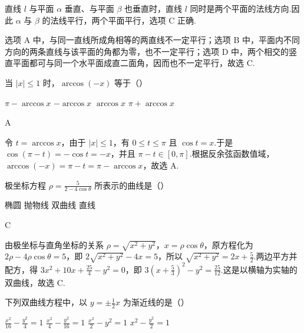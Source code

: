 \documentclass[UTF8,a4paper,oneside,11pt]{ctexbook}
\begin{document}
\begin{solution}
直线 \(l\) 与平面 \(\alpha\) 垂直、与平面 \(\beta\) 也垂直时，直线 \(l\) 同时是两个平面的法线方向.因此 \(\alpha\) 与 \(\beta\) 的法线平行，两个平面平行，选项 C 正确.

选项 A 中，与同一直线所成角相等的两直线不一定平行；选项 B 中，平面内不同方向的两条直线与该平面的角都为零，也不一定平行；选项 D 中，两个相交的竖直平面都可与同一个水平面成直二面角，因而也不一定平行，故选 C.
\end{solution}

\begin{problem}

当 \(|x|\leqslant 1\) 时，\(\arccos(-x)\) 等于（\quad）

\choices
    {\(\pi-\arccos x\)}
    {\(-\arccos x\)}
    {\(\arccos x\)}
    {\(\pi+\arccos x\)}
\end{problem}

\begin{answer}
A
\end{answer}

\begin{solution}
令 \(t=\arccos x\)，由于 \(|x|\leqslant1\)，有 \(0\leqslant t\leqslant\pi\) 且 \(\cos t=x\).于是
\(\cos(\pi-t)=-\cos t=-x\)，并且 \(\pi-t\in[0,\pi]\).根据反余弦函数值域，
\(\arccos(-x)=\pi-t=\pi-\arccos x\)，故选 A.
\end{solution}

\begin{problem}

极坐标方程 \(\rho=\frac{5}{2-4\cos\theta}\) 所表示的曲线是（\quad）

\choices
    {椭圆}
    {抛物线}
    {双曲线}
    {直线}
\end{problem}

\begin{answer}
C
\end{answer}

\begin{solution}
由极坐标与直角坐标的关系 \(\rho=\sqrt{x^2+y^2}\)，\(x=\rho\cos\theta\)，原方程化为
\(2\rho-4\rho\cos\theta=5\)，即
\(2\sqrt{x^2+y^2}-4x=5\)，所以
\(\sqrt{x^2+y^2}=2x+\frac{5}{2}\).两边平方并配方，得
\(3x^2+10x+\frac{25}{4}-y^2=0\)，即
\(3\left(x+\frac{5}{3}\right)^2-y^2=\frac{25}{12}\).这是以横轴为实轴的双曲线，故选 C.
\end{solution}

\begin{problem}

下列双曲线方程中，以 \(y=\pm \frac{1}{2}x\) 为渐近线的是（\quad）

\choices
    {\(\frac{x^2}{16}-\frac{y^2}{4}=1\)}
    {\(\frac{x^2}{4}-\frac{y^2}{16}=1\)}
    {\(\frac{x^2}{2}-y^2=1\)}
    {\(x^2-\frac{y^2}{2}=1\)}
\end{problem}
\end{document}
